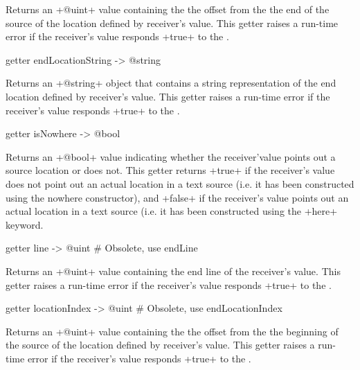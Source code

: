 Returns an \ggs+@uint+ value containing the the offset from the the end of the source of the location defined by receiver's value. This getter raises a run-time error if the receiver's value responds \ggs+true+ to the .




\begin{galgas}
getter endLocationString -> @string
\end{galgas}

Returns an \ggs+@string+ object that contains a string representation of the end location defined by receiver's value. This getter raises a run-time error if the receiver's value responds \ggs+true+ to the .



\begin{galgas}
getter isNowhere -> @bool
\end{galgas}

Returns an \ggs+@bool+ value indicating whether the receiver'value points out a source location or does not. This getter returns \ggs+true+ if the receiver's value does not point out an actual location in a text source (i.e. it has been constructed using the nowhere constructor), and \ggs+false+ if the receiver's value points out an actual location in a text source (i.e. it has been constructed using the \ggs+here+ keyword.



\begin{galgas}
getter line -> @uint  # Obsolete, use endLine
\end{galgas}

Returns an \ggs+@uint+ value containing the end line of the receiver's value. This getter raises a run-time error if the receiver's value responds \ggs+true+ to the .




\begin{galgas}
getter locationIndex -> @uint # Obsolete, use endLocationIndex
\end{galgas}

Returns an \ggs+@uint+ value containing the the offset from the the beginning of the source of the location defined by receiver's value. This getter raises a run-time error if the receiver's value responds \ggs+true+ to the .



